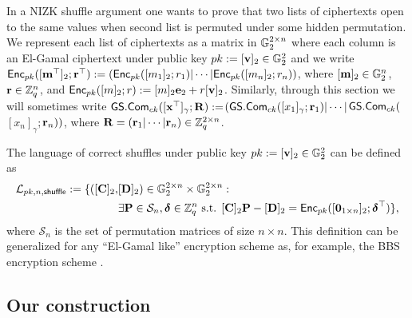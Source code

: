 In a NIZK shuffle argument one wants to prove that two lists of ciphertexts open to the same values when second list is permuted under some hidden permutation.
We represent each list of ciphertexts as a matrix in $\mathbb{G}_2^{2\times n}$ where each column is an El-Gamal ciphertext under public key $pk:=[\mathbf{v}]_2\in\mathbb{G}^2_2$ and we write $\mathsf{Enc}_{pk}([\mathbf{m}^\top]_2;\mathbf{r}^\top):=(\mathsf{Enc}_{pk}([m_1]_2;r_1)|\cdots|\mathsf{Enc}_{pk}([m_n]_2;r_n))$, where $[\mathbf{m}]_2\in\mathbb{G}_2^n$, $\mathbf{r}\in\mathbb{Z}_q^n$, and $\mathsf{Enc}_{pk}([m]_2;r):=[m]_2\mathbf{e}_2+r[\mathbf{v}]_2$. Similarly, through this section we will sometimes write ${\mathsf{GS}}.\mathsf{Com}_{ck}([\mathbf{x}^\top]_\gamma;\mathbf{{R}}):=$\-$({\mathsf{GS}}.\mathsf{Com}_{ck}([x_1]_\gamma;\mathbf{r}_1)|\cdots|$${\mathsf{GS}}.\mathsf{Com}_{ck}($$[x_n]_\gamma;$$\mathbf{r}_n))$, where $\mathbf{{R}}=(\mathbf{r}_1|\cdots|\mathbf{r}_n)\in\mathbb{Z}_q^{2\times n}$.

The language of correct shuffles under public key $pk:=[\mathbf{v}]_2\in\mathbb{G}^2_2$ can be defined as 
\begin{align*}
\mathcal{L}_{pk,n,\mathsf{shuffle}}:=\{([\mathbf{{C}}]_2,&[\mathbf{{D}}]_2)\in\mathbb{G}_2^{2\times n}\times \mathbb{G}_2^{2\times n} :\\
                                                         &\exists \mathbf{{P}}\in\mathcal{S}_n,{\boldsymbol \delta}\in\mathbb{Z}_q^n \text{ s.t. } {[\mathbf{{C}}]_2\mathbf{{P}}-[\mathbf{{D}}]_2 = \mathsf{Enc}_{pk}([\mathbf{0}_{1\times n}]_2;{\boldsymbol \delta}^\top)}\},
\end{align*}
where $\mathcal{S}_n$ is the set of permutation matrices of size $n\times n$. This definition can be generalized for any ``El-Gamal like'' encryption scheme as, for example, the BBS encryption scheme \cite{C:BonBoySha04}.

 
\subsection{Our construction}

